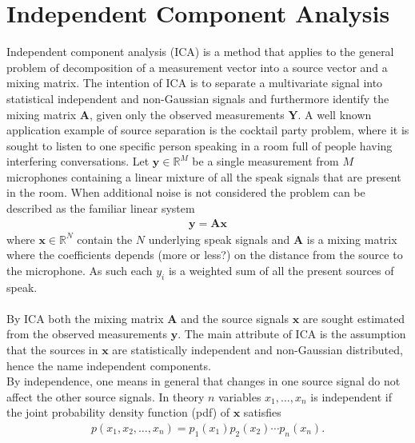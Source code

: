 \section{Independent Component Analysis}\label{sec:ICA}
Independent component analysis (ICA) is a method that applies to  the general problem of decomposition of a measurement vector into a source vector and a mixing matrix. 
The intention of ICA is to separate a multivariate signal into statistical independent and non-Gaussian signals and furthermore identify the mixing matrix $\mathbf{A}$, given only the observed measurements $\mathbf{Y}$.
A well known application example of source separation is the cocktail party problem, where it is sought to listen to one specific person speaking in a room full of people having interfering conversations. 
Let $\mathbf{y} \in \mathbb{R}^M$ be a single measurement from $M$ microphones containing a linear mixture of all the speak signals that are present in the room. 
When additional noise is not considered the problem can be described as the familiar linear system 
\begin{align}\label{eq:ICA1}
\mathbf{y} = \mathbf{Ax}
\end{align}
where $\mathbf{x}\in \mathbb{R}^N$ contain the $N$ underlying speak signals and $\mathbf{A}$ is a mixing matrix where the coefficients depends (more or less?) on the distance from the source to the microphone. 
As such each $y_i$ is a weighted sum of all the present sources of speak.
\\ \\
By ICA both the mixing matrix $\mathbf{A}$ and the source signals $\mathbf{x}$ are sought estimated from the observed measurements $\mathbf{y}$. 
The main attribute of ICA is the assumption that the sources in $\mathbf{x}$ are statistically independent and non-Gaussian distributed, hence the name independent components.
\\     
By independence, one means in general that changes in one source signal do not affect the other source signals. 
In theory $n$ variables $x_1, \hdots , x_n$ is independent if the joint probability density function (pdf) of $\mathbf{x}$ satisfies
\begin{align*}
p(x_1, x_2, \dots, x_n) = p_1(x_1) p_2(x_2) \cdots p_n(x_n).
\end{align*}


